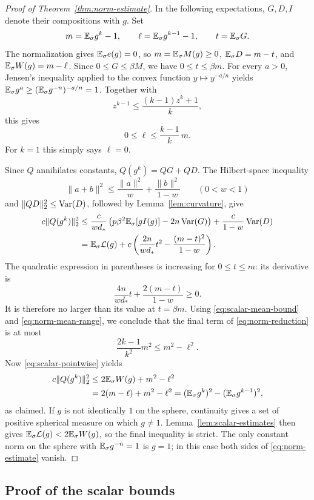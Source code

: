 \begin{proof}[Proof of Theorem~\ref{thm:norm-estimate}]
In the following expectations, $G,D,I$ denote their compositions with
$g$.  Set
\[
 m=\mathbb E_{\sigma} g^k-1,\qquad \ell=\mathbb E_{\sigma} g^{k-1}-1,\qquad t=\mathbb E_{\sigma} G.
\]
The normalization gives $\mathbb E_{\sigma} e(g)=0$, so $m=\mathbb E_{\sigma} M(g)\ge0$,
$\mathbb E_{\sigma} D=m-t$, and $\mathbb E_{\sigma} W(g)=m-\ell$.  Since
$0\le G\le\beta M$, we have $0\le t\le\beta m$.
For every $a>0$, Jensen's inequality applied to the convex function
$y\mapsto y^{-a/n}$ yields
$\mathbb E_{\sigma} g^a\ge(\mathbb E_{\sigma} g^{-n})^{-a/n}=1$.
Together with
\[
 z^{k-1}\le\frac{(k-1)z^k+1}{k},
\]
this gives
\begin{equation}\label{eq:norm-mean-range}
 0\le\ell\le\frac{k-1}{k}\,m.
\end{equation}
For $k=1$ this simply says $\ell=0$.

Since $Q$ annihilates constants,
$Q(g^k)=QG+QD$.  The Hilbert-space inequality
\[
 \|a+b\|^2\le\frac{\|a\|^2}{w}
                       +\frac{\|b\|^2}{1-w}
 \qquad(0<w<1)
\]
and $\|QD\|_2^2\le\operatorname{Var}(D)$, followed by
Lemma~\ref{lem:curvature}, give
\begin{align}
 c\|Q(g^k)\|_2^2
 &\le\frac{c}{wd_*}
       \left(p\beta^2\mathbb E_{\sigma}[gI(g)]-2n\operatorname{Var}(G)\right)
       +\frac{c}{1-w}\operatorname{Var}(D)\notag\\
 &=\mathbb E_{\sigma}\mathcal L(g)+c\left(
       \frac{2n}{wd_*}t^2-\frac{(m-t)^2}{1-w}\right).
 \label{eq:norm-reduction}
\end{align}
The quadratic expression in parentheses is increasing for
$0\le t\le m$: its derivative is
\[
 \frac{4n}{wd_*}t+\frac{2(m-t)}{1-w}\ge0.
\]
It is therefore no larger than its value at $t=\beta m$.
Using \eqref{eq:scalar-mean-bound} and
\eqref{eq:norm-mean-range}, we conclude that the final term of
\eqref{eq:norm-reduction} is at most
\[
 \frac{2k-1}{k^2}m^2\le m^2-\ell^2.
\]
Now \eqref{eq:scalar-pointwise} yields
\begin{align*}
 c\|Q(g^k)\|_2^2
 &\le 2\mathbb E_{\sigma} W(g)+m^2-\ell^2\\
 &=2(m-\ell)+m^2-\ell^2
   =(\mathbb E_{\sigma} g^k)^2-(\mathbb E_{\sigma} g^{k-1})^2,
\end{align*}
as claimed.  If $g$ is not identically $1$ on the sphere, continuity
gives a set of positive spherical measure on which $g\ne1$.
Lemma~\ref{lem:scalar-estimates} then gives
$\mathbb E_{\sigma}\mathcal L(g)<2\mathbb E_{\sigma} W(g)$, so the final inequality is strict.
The only constant norm on the sphere with $\mathbb E_{\sigma} g^{-n}=1$ is $g=1$;
in this case both sides of \eqref{eq:norm-estimate} vanish.
\end{proof}

\subsection{Proof of the scalar bounds}

